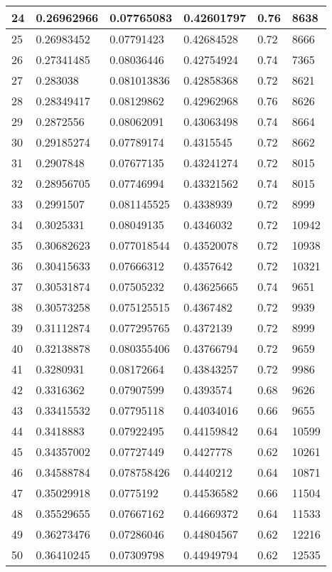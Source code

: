 \begin{longtable}{|l|l|l|l|l|l|}
24 & 0.26962966 & 0.07765083 & 0.42601797 & 0.76 & 8638 \\ \hline 
25 & 0.26983452 & 0.07791423 & 0.42684528 & 0.72 & 8666 \\ \hline 
26 & 0.27341485 & 0.08036446 & 0.42754924 & 0.74 & 7365 \\ \hline 
27 & 0.283038 & 0.081013836 & 0.42858368 & 0.72 & 8621 \\ \hline 
28 & 0.28349417 & 0.08129862 & 0.42962968 & 0.76 & 8626 \\ \hline 
29 & 0.2872556 & 0.08062091 & 0.43063498 & 0.74 & 8664 \\ \hline 
30 & 0.29185274 & 0.07789174 & 0.4315545 & 0.72 & 8662 \\ \hline 
31 & 0.2907848 & 0.07677135 & 0.43241274 & 0.72 & 8015 \\ \hline 
32 & 0.28956705 & 0.07746994 & 0.43321562 & 0.74 & 8015 \\ \hline 
33 & 0.2991507 & 0.081145525 & 0.4338939 & 0.72 & 8999 \\ \hline 
34 & 0.3025331 & 0.08049135 & 0.4346032 & 0.72 & 10942 \\ \hline 
35 & 0.30682623 & 0.077018544 & 0.43520078 & 0.72 & 10938 \\ \hline 
36 & 0.30415633 & 0.07666312 & 0.4357642 & 0.72 & 10321 \\ \hline 
37 & 0.30531874 & 0.07505232 & 0.43625665 & 0.74 & 9651 \\ \hline 
38 & 0.30573258 & 0.075125515 & 0.4367482 & 0.72 & 9939 \\ \hline 
39 & 0.31112874 & 0.077295765 & 0.4372139 & 0.72 & 8999 \\ \hline 
40 & 0.32138878 & 0.080355406 & 0.43766794 & 0.72 & 9659 \\ \hline 
41 & 0.3280931 & 0.08172664 & 0.43843257 & 0.72 & 9986 \\ \hline 
42 & 0.3316362 & 0.07907599 & 0.4393574 & 0.68 & 9626 \\ \hline 
43 & 0.33415532 & 0.07795118 & 0.44034016 & 0.66 & 9655 \\ \hline 
44 & 0.3418883 & 0.07922495 & 0.44159842 & 0.64 & 10599 \\ \hline 
45 & 0.34357002 & 0.07727449 & 0.4427778 & 0.62 & 10261 \\ \hline 
46 & 0.34588784 & 0.078758426 & 0.4440212 & 0.64 & 10871 \\ \hline 
47 & 0.35029918 & 0.0775192 & 0.44536582 & 0.66 & 11504 \\ \hline 
48 & 0.35529655 & 0.07667162 & 0.44669372 & 0.64 & 11533 \\ \hline 
49 & 0.36273476 & 0.07286046 & 0.44804567 & 0.62 & 12216 \\ \hline 
50 & 0.36410245 & 0.07309798 & 0.44949794 & 0.62 & 12535 \\ \hline 
\end{longtable}